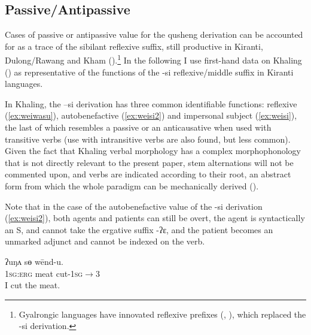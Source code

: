 \documentclass[oldfontcommands,oneside,a4paper,11pt]{article}
\newcommand{\ipa}[1]{{\phon \mbox{#1}}} %
\begin{document}

\subsection{Passive/Antipassive} \label{sec:passive}
Cases of passive or antipassive value for the qusheng derivation can be accounted for as a trace of the sibilant reflexive suffix, still productive in Kiranti, Dulong/Rawang and Kham (\citealt[320]{driem93agreement}).\footnote{Gyalrongic languages have innovated reflexive prefixes (\citealt{jacques10refl}, \citealt[89]{lai13affixale}), which replaced the \ipa{-si} derivation.} In the following I use first-hand data on Khaling (\citealt{jacques16si}) as representative of the functions of the \ipa{-si} reflexive/middle suffix in Kiranti languages.

In Khaling, the  \ipa{--si} derivation has three common identifiable functions: reflexive (\ref{ex:weiwasu}), autobenefactive (\ref{ex:weisi2}) and impersonal subject (\ref{ex:weisi}), the last of which resembles a passive or an anticausative when used with transitive verbs (use with intransitive verbs are also found, but less common). Given the fact that Khaling verbal morphology has a complex morphophonology that is not directly relevant to the present paper, stem alternations will not be commented upon, and verbs are indicated according to their root, an abstract form from which the whole paradigm can be mechanically derived (\citealt{jacques12khaling, jacques16si}).

Note that in the case of the autobenefactive value of the \ipa{-si} derivation (\ref{ex:weisi2}), both agents and patients can still be overt, the agent is syntactically an S, and cannot take the ergative suffix \ipa{-ʔɛ}, and the patient becomes an unmarked adjunct and cannot be indexed on the verb.
 
\begin{exe}
\ex \label{ex:wendu} 
\gll 
\ipa{ʔuŋʌ}  	\ipa{sɵ}  	\ipa{wēnd-u.}  \\
\textsc{1sg:erg} meat cut-\textsc{1sg$\rightarrow$3} \\
\glt I cut the meat.
\end{exe}
\end{document}
